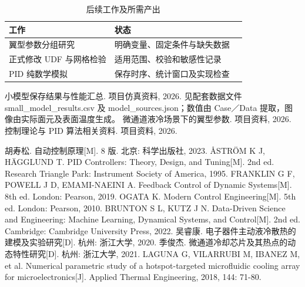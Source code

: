 \documentclass[stage2,fontset=fandol]{ydzjreport}
\begin{document}
\clearpage
\setcounter{table}{8}
\begin{table}[H]\centering
\caption{后续工作及所需产出}\label{tab:plan}
\begin{tabularx}{\textwidth}{@{}Y Y Y@{}}
\toprule
{} 工作 & 状态 \\
\midrule
翼型参数分组研究 & 明确变量、固定条件与缺失数据 \\
正式修改 UDF 与网格检验 & 适用范围、校验和敏感性记录  \\
PID 纯数学模拟 & 保存时序、统计窗口及实现检查  \\
\bottomrule\end{tabularx}\end{table}
\clearpage
\begin{thebibliography}{9}

 小模型保存结果与性能汇总. 项目仿真资料, 2026. 见配套数据文件 small\_model\_results.csv 及 model\_sources.json；数值由 Case／Data 提取，图像由实际面元及表面温度生成。
 微通道液冷场景下的翼型参数. 项目资料, 2026.
 控制理论与 PID 算法相关资料. 项目资料, 2026.

 胡寿松. 自动控制原理[M]. 8 版. 北京: 科学出版社, 2023.
 {\AA}STR{\"O}M K J, H{\"A}GGLUND T. PID Controllers: Theory, Design, and Tuning[M]. 2nd ed. Research Triangle Park: Instrument Society of America, 1995.
 FRANKLIN G F, POWELL J D, EMAMI-NAEINI A. Feedback Control of Dynamic Systems[M]. 8th ed. London: Pearson, 2019.
 OGATA K. Modern Control Engineering[M]. 5th ed. London: Pearson, 2010.
 BRUNTON S L, KUTZ J N. Data-Driven Science and Engineering: Machine Learning, Dynamical Systems, and Control[M]. 2nd ed. Cambridge: Cambridge University Press, 2022.
 吴睿康. 电子器件主动液冷散热的建模及实验研究[D]. 杭州: 浙江大学, 2020.
 季俊杰. 微通道冷却芯片及其热点的动态特性研究[D]. 杭州: 浙江大学, 2021.
 LAGUNA G, VILARRUBI M, IBANEZ M, et al. Numerical parametric study of a hotspot-targeted microfluidic cooling array for microelectronics[J]. Applied Thermal Engineering, 2018, 144: 71-80.
\end{thebibliography}
\end{document}
